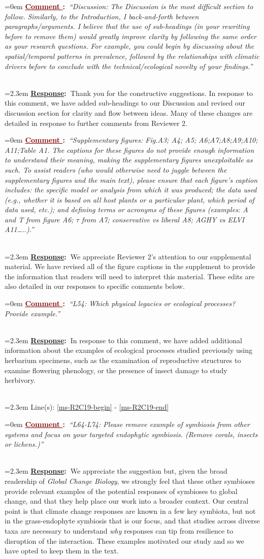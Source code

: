 \documentclass[12pt]{article}
\newcounter{cN}
\newcommand{\comment}[1]{
	\vspace{2em}
	\refstepcounter{cN} %
	\noindent \hangindent=0em \textbf{\textcolor{Maroon}{\uline{Comment \thecN}:~}}\emph{``#1''}
	}
\newcommand{\response}[1]{
	\\[0.25em]
	\hangindent=2.3em \textbf{\textcolor{NavyBlue}{\uline{Response}:~}}#1
	}
\newcommand{\linesref}[2]{
		\\[0.25em]
	\hangindent=2.3em {\color{Mahogany} Line(s): \ref{#1} - \ref{#2}}
}
\begin{document}
\comment{Discussion: The Discussion is the most difficult section to follow. Similarly, to the Introduction, I back-and-forth between paragraphs/arguments. I believe that the use of sub-headings (in your rewriting before to remove them) would greatly improve clarity by following the same order as your research questions. For example, you could begin by discussing about the spatial/temporal patterns in prevalence, followed by the relationships with climatic drivers before to conclude with the technical/ecological novelty of your findings.}
\response{Thank you for the constructive suggestions. In response to this comment, we have added sub-headings to our Discussion and revised our discussion section for clarity and flow between ideas. Many of these changes are detailed in response to further comments from Reviewer 2.}

\comment{Supplementary figures: Fig.A3; A4; A5; A6;A7;A8;A9;A10; A11;Table A1. The captions for these figures do not provide enough information to understand their meaning, making the supplementary figures unexploitable as such. To assist readers (who would otherwise need to juggle between the supplementary figures and the main text), please ensure that each figure’s caption includes: the specific model or analysis from which it was produced; the data used (e.g., whether it is based on all host plants or a particular plant, which period of data used, etc.); and defining terms or acronyms of these figures (examples: A and T from figure A6; $\tau$ from A7; conservative vs liberal A8; AGHY vs ELVI A11…..).}
\response{We appreciate Reviewer 2's attention to our supplemental material. We have revised all of the figure captions in the supplement to provide the information that readers will need to interpret this material. These edits are also detailed in our responses to specific comments below.}


\comment{L54: Which physical legacies or ecological processes? Provide example.}
\response{In response to this comment, we have added additional information about the examples of ecological processes studied previously using herbarium specimens, such as the examination of reproductive structures to examine flowering phenology, or the presence of insect damage to study herbivory.}
\linesref{ms-R2C19-begin}{ms-R2C19-end}



\comment{L64-L74: Please remove example of symbiosis from other systems and focus on your targeted endophytic symbiosis. (Remove corals, insects or lichens.)}
\response{We appreciate the suggestion but, given the broad readership of \textit{Global Change Biology}, we strongly feel that these other symbioses provide relevant examples of the potential responses of symbioses to global change, and that they help place our work into a broader context. Our central point is that climate change responses are known in a few key symbiota, but not in the grass-endophyte symbiosis that is our focus, and that studies across diverse taxa are necessary to understand \emph{why} responses can tip from resilience to disruption of the interaction. These examples motivated our study and so we have opted to keep them in the text.}
\end{document}
